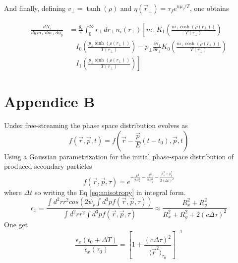 \documentclass[12pt,a4paper]{book}
\begin{document}
	And finally, defining \( v_\perp = \tanh(\rho) \) and \( \eta(\vec{r}_\perp) = \tau_f e^{n \mu_i / T} \), one obtains
	
	\begin{equation}
		\begin{aligned}
			\frac{dN_i}{dy \, m_\perp \, dm_\perp \, d\phi_p} &= \frac{g_i}{\pi} \int_{0}^{\infty} r_\perp \, dr_\perp \, n_i(r_\perp) \left[ m_\perp K_1 \left( \frac{m_\perp \cosh(\rho(r_\perp))}{T(r_\perp)}\right) \right. \\
			& \quad \left. I_0 \left( \frac{p_\perp \sinh(\rho(r_\perp))}{T(r_\perp)} \right) - p_\perp \frac{\partial \tau_f}{\partial r_\perp} K_0 \left( \frac{m_\perp \cosh(\rho(r_\perp))}{T(r_\perp)}\right) \right. \\
			& \quad \left. I_1 \left( \frac{p_\perp \sinh(\rho(r_\perp))}{T(r_\perp)} \right) \right]
		\end{aligned}
		\label{eq:momentum_cooper-frye_a}
	\end{equation}
	
	\section{Appendice B} \label{app:B}
	Under free-streaming the phase space distribution evolves as
	\begin{equation}
		f(\vec{r},\vec{p}, t) = f(\vec{r} - \frac{\vec{p}}{E}(t-t_0), \vec{p}, t) 
	\end{equation}
	Using a Gaussian parametrization for the initial phase-space distribution of produced secondary particles
	\begin{equation}
		f(\vec{r},\vec{p}, \tau) =e^{- \frac{x^2}{2 R_x^2} - \frac{y^2}{2 R_y^2}- \frac{p_x^2+ p_y^2}{2 (\Delta \tau)^2}}
	\end{equation}
	where $\Delta t$ so writing the Eq \ref{eq:anisotropy} in integral form.
	\begin{equation}
		\epsilon_x = \frac{\int d^2 r r^2 cos(2 \psi_r \int d^3 p f(\vec{r},\vec{p}, \tau))}{\int d^2 r r^2  \int d^3 p f(\vec{r},\vec{p}, \tau)} \approx \frac{R_x^2 +R_y^2}{R_x^2 +R_y^2 + 2(c \Delta \tau)^2}
	\end{equation}
	One get
	\begin{equation}
		\frac{\epsilon_x(t_0 + \Delta T)}{\epsilon_x(\tau_0)} = \left[ 1 + \frac{(c \Delta \tau)^2}{\langle \vec{r}^2 \rangle_{\tau_0}} \right]^{-1}
	\end{equation}
	
\end{document}
